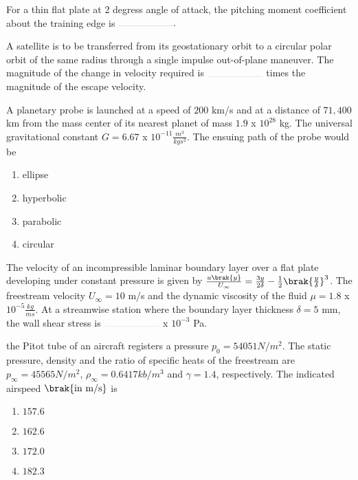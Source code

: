 \item For a thin flat plate at $2$ degress angle of attack, the pitching moment coefficient about the training edge is $\rule{2cm}{0.1pt}.$
\hfill{}

\item A satellite is to be transferred from its geostationary orbit to a circular polar orbit of the same radius through a single impulse out-of-plane maneuver. The magnitude of the change in velocity required is $\rule{2cm}{0.1pt}$ times the magnitude of the escape velocity.
\hfill{}

\item A planetary probe is launched at a speed of $200$ km/s and at a distance of $71,400$ km from the mass center of its nearest planet of mass $1.9$ x $10^{28}$ kg. The universal gravitational constant $G = 6.67$ x $10^{-11} \frac{m^3}{kg s^2}$. The ensuing path of the probe would be
\hfill{}
\begin{enumerate}
\item ellipse
\item hyperbolic
\item parabolic
\item circular
\end{enumerate}

\item The velocity of an incompressible laminar boundary layer over a flat plate developing under constant pressure is given by $\frac{u\brak{y}}{U_{\infty}} = \frac{3y}{2\delta} - \frac{1}{2}\brak{\frac{y}{\delta}}^3$. The freestream velocity $U_\infty = 10$ m/s and the dynamic viscosity of the fluid $\mu = 1.8$ x $10^{-5}\frac{kg}{ms}$. At a streamwise station where the boundary layer thickness $\delta = 5$ mm, the wall shear stress is $\rule{2cm}{0.1pt}$ x $10^{-3}$ Pa.
\hfill{}

\item the Pitot tube of an aircraft registers a pressure $p_0 = 54051 N/m^2$. The static pressure, density and the ratio of specific heats of the freestream are $p_\infty = 45565 N/m^2$, $\rho_\infty = 0.6417 kb/m^3$ and $\gamma = 1.4$, respectively. The indicated airspeed $\brak{\text{in m/s}}$ is
\hfill{}
\begin{enumerate}
\item $157.6$
\item $162.6$
\item $172.0$
\item $182.3$
\end{enumerate}

